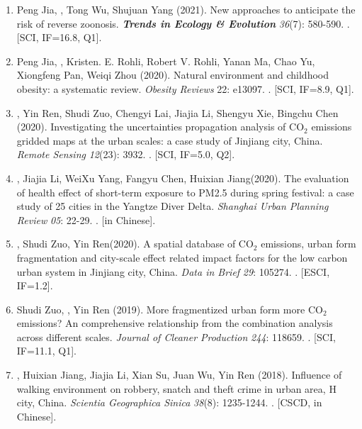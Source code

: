 \begin{enumerate}
\item
    Peng Jia\CS, \Shaoqing, Tong Wu, Shujuan Yang (2021).
    New approaches to anticipate the risk of reverse zoonosis.
    \textbf{\textit{Trends in Ecology \& Evolution}} \textit{36}(7): 580-590.
    . [SCI, IF=16.8, Q1].
\item
    Peng Jia\CS, \Shaoqing, Kristen. E. Rohli, Robert V. Rohli, Yanan Ma, Chao Yu, Xiongfeng Pan, Weiqi Zhou (2020).
    Natural environment and childhood obesity: a systematic review.
    \textit{Obesity Reviews} 22: e13097.
    . [SCI, IF=8.9, Q1].
\item
    \Shaoqing\CF, Yin Ren\CF, Shudi Zuo\CS, Chengyi Lai, Jiajia Li, Shengyu Xie, Bingchu Chen (2020).
    Investigating the uncertainties propagation analysis of CO$_2$ emissions gridded maps at the urban scales: a case study of Jinjiang city, China. 
    \textit{Remote Sensing} \textit{12}(23): 3932.
    . [SCI, IF=5.0, Q2].
\item
    \Shaoqing, Jiajia Li, WeiXu Yang, Fangyu Chen, Huixian Jiang\CS (2020).
    The evaluation of health effect of short-term exposure to PM2.5 during spring festival: a case study of 25 cities in the Yangtze Diver Delta.
    \textit{Shanghai Urban Planning Review} \textit{05}: 22-29.
    . [in Chinese].
\item
    \Shaoqing, Shudi Zuo, Yin Ren\CS (2020).
    A spatial database of CO$_2$ emissions, urban form fragmentation and city-scale effect related impact factors for the low carbon urban system in Jinjiang city, China.
    \textit{Data in Brief} \textit{29}: 105274.
    . [ESCI, IF=1.2].
\item
    Shudi Zuo, \Shaoqing, Yin Ren (2019).
    More fragmentized urban form more CO$_2$ emissions? An comprehensive relationship from the combination analysis across different scales.
    \textit{Journal of Cleaner Production} \textit{244}: 118659.
    . [SCI, IF=11.1, Q1].
\item
    \Shaoqing, Huixian Jiang\CS, Jiajia Li, Xian Su, Juan Wu, Yin Ren (2018).
	Influence of walking environment on robbery, snatch and theft crime in urban area, H city, China.
    \textit{Scientia Geographica Sinica}  \textit{38}(8): 1235-1244.
    . [CSCD, in Chinese].
\end{enumerate}

